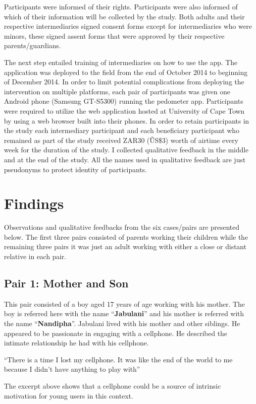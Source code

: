 Participants were informed of their rights. Participants were also informed of which of their information will be collected by the study. Both adults and their respective intermediaries signed consent forms except for intermediaries who were minors, these signed assent forms that were approved by their respective parents/guardians. 

The next step entailed training of intermediaries on how to use the app. The application was deployed to the field from the end of October 2014 to beginning of December 2014. In order to limit potential complications from deploying the intervention on multiple platforms, each pair of participants was given one Android phone (Samsung GT-S5300) running the pedometer app. Participants were required to utilize the web application hosted at University of Cape Town by using a web browser built into their phones. In order to retain participants in the study each intermediary participant and each beneficiary participant who remained as part of the study received ZAR30 (\~US\$3) worth of airtime every week for the duration of the study. I collected qualitative feedback in the middle and at the end of the study. All the names used in qualitative feedback are just pseudonyms to protect identity of participants.
\section{Findings}
Observations and qualitative feedbacks from the six cases/pairs are presented below. The first three pairs consisted of parents working their children while the remaining three pairs it was just an adult working with either a close or distant relative in each pair.
\subsection*{\textbf{Pair 1: Mother and Son}}
This pair consisted of a boy aged 17 years of age working with his mother. The boy is referred here with the name ``\textbf{Jabulani}'' and his mother is referred with the name ``\textbf{Nandipha}''. Jabulani lived with his mother and other siblings. He appeared to be passionate in engaging with a cellphone. He described the intimate relationship he had with his cellphone.

 {``There is a time I lost my cellphone. It was like the end of the world to me because I didn't have anything to play with''}

The excerpt above shows that a cellphone could be a source of intrinsic motivation for young users in this context. 

